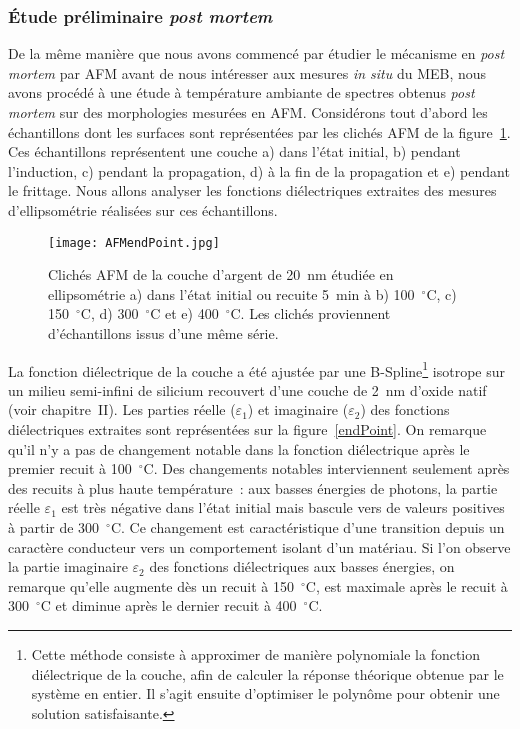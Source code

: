 \subsubsection{Étude préliminaire \textit{post mortem}}
De la même manière que nous avons commencé par étudier le mécanisme en \textit{post mortem} par AFM avant de nous intéresser aux mesures \textit{in situ} du MEB, nous avons procédé à une étude à température ambiante de spectres obtenus \textit{post mortem} sur des morphologies mesurées en AFM. Considérons tout d'abord les échantillons dont les surfaces sont représentées par les clichés AFM de la figure~\ref{AFMendPoint}. Ces échantillons représentent une couche a) dans l'état initial, b) pendant l'induction, c) pendant la propagation, d) à la fin de la propagation et e) pendant le frittage. Nous allons analyser les fonctions diélectriques extraites des mesures d'ellipsométrie réalisées sur ces échantillons.\par 

\begin{figure}[h]
	\centering
	\texttt{[image: AFMendPoint.jpg]}
	\caption{Clichés AFM de la couche d'argent de 20~nm étudiée en ellipsométrie a) dans l'état initial ou recuite 5~min à b) 100~$^\circ$C, c) 150~$^\circ$C, d) 300~$^\circ$C et e) 400~$^\circ$C. Les clichés proviennent d'échantillons issus d'une même série.}
	\label{AFMendPoint}
\end{figure}

La fonction diélectrique de la couche a été ajustée par une B-Spline\footnote{Cette méthode consiste à approximer de manière polynomiale la fonction diélectrique de la couche, afin de calculer la réponse théorique obtenue par le système en entier. Il s'agit ensuite d'optimiser le polynôme pour obtenir une solution satisfaisante.} isotrope sur un milieu semi-infini de silicium recouvert d'une couche de 2~nm d'oxide natif (voir chapitre~II). Les parties réelle ($\varepsilon_1$) et imaginaire ($\varepsilon_2$) des fonctions diélectriques extraites sont représentées sur la figure~\ref{endPoint}. On remarque qu'il n'y a pas de changement notable dans la fonction diélectrique après le premier recuit à 100~$^\circ$C. Des changements notables interviennent seulement après des recuits à plus haute température~: aux basses énergies de photons, la partie réelle $\varepsilon_1$ est très négative dans l'état initial mais bascule vers de valeurs positives à partir de 300~$^\circ$C. Ce changement est caractéristique d'une transition depuis un caractère conducteur vers un comportement isolant d'un matériau. Si l'on observe la partie imaginaire $\varepsilon_2$ des fonctions diélectriques aux basses énergies, on remarque qu'elle augmente dès un recuit à 150~$^\circ$C, est maximale après le recuit à 300~$^\circ$C et diminue après le dernier recuit à 400~$^\circ$C.\par

